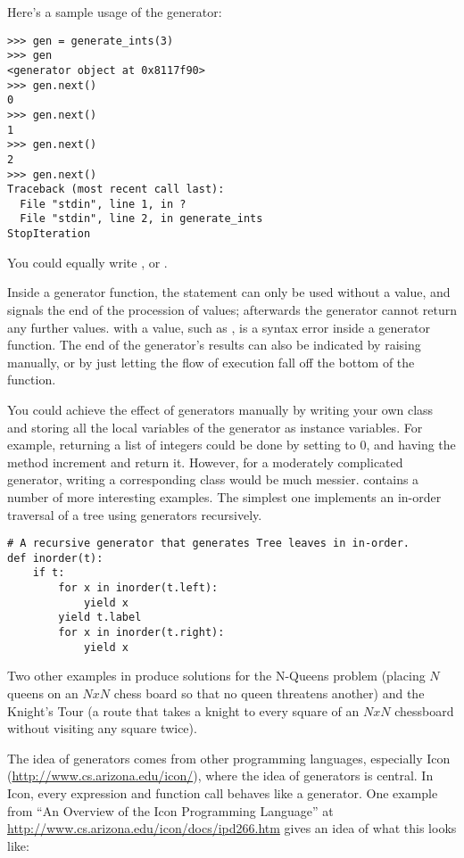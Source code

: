 \documentclass{howto}
\begin{document}
Here's a sample usage of the  generator:

\begin{verbatim}
>>> gen = generate_ints(3)
>>> gen
<generator object at 0x8117f90>
>>> gen.next()
0
>>> gen.next()
1
>>> gen.next()
2
>>> gen.next()
Traceback (most recent call last):
  File "stdin", line 1, in ?
  File "stdin", line 2, in generate_ints
StopIteration
\end{verbatim}

You could equally write , or
.

Inside a generator function, the  statement can only
be used without a value, and signals the end of the procession of
values; afterwards the generator cannot return any further values.
 with a value, such as , is a syntax
error inside a generator function.  The end of the generator's results
can also be indicated by raising  manually,
or by just letting the flow of execution fall off the bottom of the
function.

You could achieve the effect of generators manually by writing your
own class and storing all the local variables of the generator as
instance variables.  For example, returning a list of integers could
be done by setting  to 0, and having the
 method increment  and return it.
However, for a moderately complicated generator, writing a
corresponding class would be much messier.
 contains a number of more
interesting examples.  The simplest one implements an in-order
traversal of a tree using generators recursively.

\begin{verbatim}
# A recursive generator that generates Tree leaves in in-order.
def inorder(t):
    if t:
        for x in inorder(t.left):
            yield x
        yield t.label
        for x in inorder(t.right):
            yield x
\end{verbatim}

Two other examples in  produce
solutions for the N-Queens problem (placing $N$ queens on an $NxN$
chess board so that no queen threatens another) and the Knight's Tour
(a route that takes a knight to every square of an $NxN$ chessboard
without visiting any square twice). 

The idea of generators comes from other programming languages,
especially Icon (\url{http://www.cs.arizona.edu/icon/}), where the
idea of generators is central.  In Icon, every
expression and function call behaves like a generator.  One example
from ``An Overview of the Icon Programming Language'' at
\url{http://www.cs.arizona.edu/icon/docs/ipd266.htm} gives an idea of
what this looks like:
\end{document}
